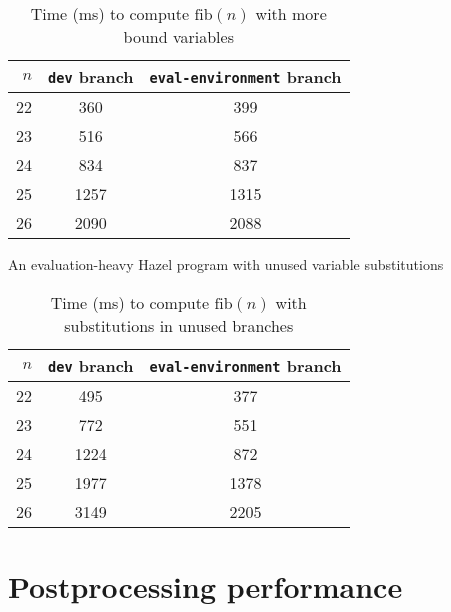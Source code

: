 \begin{singlespace}
  \begin{table}
    \centering
    \begin{tabular}{r|cc}
      \hline
      $n$ & \texttt{dev} branch & \texttt{eval-environment} branch \\
      \hline\hline
      22 & 360 & 399 \\
      23 & 516 & 566 \\
      24 & 834 & 837 \\
      25 & 1257 & 1315 \\
      26 & 2090 & 2088 \\
      \hline\hline
    \end{tabular}
    \caption{Time (ms) to compute $\text{fib}(n)$ with more bound variables}
    \label{tab:perf-fib-more-bindings}
  \end{table}
\end{singlespace}


\begin{listing}
  \caption{An evaluation-heavy Hazel program with unused variable substitutions}
  \label{fig:perf-fib-more-branches}
\end{listing}

\begin{singlespace}
  \begin{table}
    \centering
    \begin{tabular}{r|cc}
      \hline
      $n$ & \texttt{dev} branch & \texttt{eval-environment} branch \\
      \hline\hline
      22 & 495 & 377 \\
      23 & 772 & 551 \\
      24 & 1224 & 872 \\
      25 & 1977 & 1378 \\
      26 & 3149 & 2205 \\
      \hline\hline
    \end{tabular}
    \caption{Time (ms) to compute $\text{fib}(n)$ with substitutions in unused branches}
    \label{tab:perf-fib-more-branches}
  \end{table}
\end{singlespace}

\section{Postprocessing performance}
\label{sec:evaluation-renumbering}

